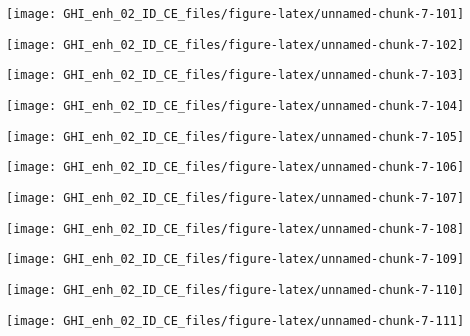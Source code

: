 \documentclass[
  10pt,
  a4paper,oneside]{article}
\begin{document}
\begin{center}\texttt{[image: GHI\_enh\_02\_ID\_CE\_files/figure-latex/unnamed-chunk-7-101]} \end{center}

\begin{center}\texttt{[image: GHI\_enh\_02\_ID\_CE\_files/figure-latex/unnamed-chunk-7-102]} \end{center}

\begin{center}\texttt{[image: GHI\_enh\_02\_ID\_CE\_files/figure-latex/unnamed-chunk-7-103]} \end{center}

\begin{center}\texttt{[image: GHI\_enh\_02\_ID\_CE\_files/figure-latex/unnamed-chunk-7-104]} \end{center}

\begin{center}\texttt{[image: GHI\_enh\_02\_ID\_CE\_files/figure-latex/unnamed-chunk-7-105]} \end{center}

\begin{center}\texttt{[image: GHI\_enh\_02\_ID\_CE\_files/figure-latex/unnamed-chunk-7-106]} \end{center}

\begin{center}\texttt{[image: GHI\_enh\_02\_ID\_CE\_files/figure-latex/unnamed-chunk-7-107]} \end{center}

\begin{center}\texttt{[image: GHI\_enh\_02\_ID\_CE\_files/figure-latex/unnamed-chunk-7-108]} \end{center}

\begin{center}\texttt{[image: GHI\_enh\_02\_ID\_CE\_files/figure-latex/unnamed-chunk-7-109]} \end{center}

\begin{center}\texttt{[image: GHI\_enh\_02\_ID\_CE\_files/figure-latex/unnamed-chunk-7-110]} \end{center}

\begin{center}\texttt{[image: GHI\_enh\_02\_ID\_CE\_files/figure-latex/unnamed-chunk-7-111]} \end{center}
\end{document}
